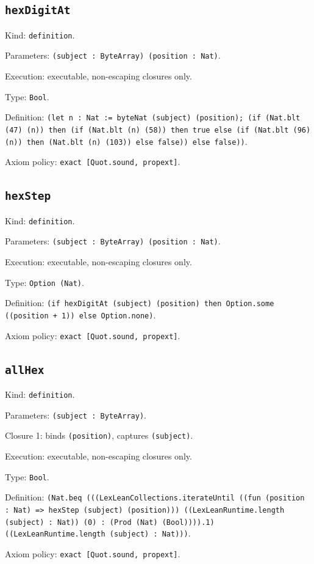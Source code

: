 \documentclass[11pt]{article}
\begin{document}
\subsection*{\texttt{hexDigitAt}}
\noindent Kind: \texttt{definition}.\par
\noindent Parameters: \texttt{(subject : ByteArray) (position : Nat)}.\par
\noindent Execution: executable, non-escaping closures only.\par
\noindent Type: \texttt{Bool}.\par
\noindent Definition: \texttt{(let n : Nat := byteNat (subject) (position); (if (Nat.blt (47) (n)) then (if (Nat.blt (n) (58)) then true else (if (Nat.blt (96) (n)) then (Nat.blt (n) (103)) else false)) else false))}.\par
\noindent Axiom policy: \texttt{exact [Quot.sound, propext]}.\par
\subsection*{\texttt{hexStep}}
\noindent Kind: \texttt{definition}.\par
\noindent Parameters: \texttt{(subject : ByteArray) (position : Nat)}.\par
\noindent Execution: executable, non-escaping closures only.\par
\noindent Type: \texttt{Option (Nat)}.\par
\noindent Definition: \texttt{(if hexDigitAt (subject) (position) then Option.some ((position + 1)) else Option.none)}.\par
\noindent Axiom policy: \texttt{exact [Quot.sound, propext]}.\par
\subsection*{\texttt{allHex}}
\noindent Kind: \texttt{definition}.\par
\noindent Parameters: \texttt{(subject : ByteArray)}.\par
\noindent Closure 1: binds \texttt{(position)}, captures \texttt{(subject)}.\par
\noindent Execution: executable, non-escaping closures only.\par
\noindent Type: \texttt{Bool}.\par
\noindent Definition: \texttt{(Nat.beq (((LexLeanCollections.iterateUntil ((fun (position : Nat) => hexStep (subject) (position))) ((LexLeanRuntime.length (subject) : Nat)) (0) : (Prod (Nat) (Bool)))).1) ((LexLeanRuntime.length (subject) : Nat)))}.\par
\noindent Axiom policy: \texttt{exact [Quot.sound, propext]}.\par
\end{document}
